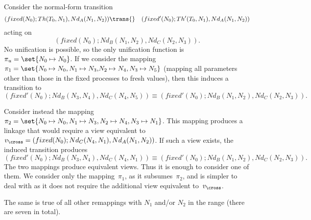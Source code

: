 \begin{example}\label{example:29}
Consider the normal-form transition
\begin{eqnarray*}
(fixed(N_0); Th(T_0,N_1), Nd_A(N_1,N_2)) & \trans{} &
  (fixed'(N_0); Th'(T_0,N_1), Nd_A(N_1,N_2))
\end{eqnarray*}
acting on 
\[
(fixed(N_0); Nd_B(N_1,N_2), Nd_C(N_2,N_3)).
\]
No unification is possible, so the only unification function is $\pi_{u} =
\set{N_0 \mapsto N_0}$.  If we consider the mapping $\pi_1 = \set{N_0 \mapsto
  N_0, \linebreak[1] {N_1 \mapsto N_3,} \linebreak[1] {N_2 \mapsto N_4},
  \linebreak[1] N_3 \mapsto N_5}$ (mapping all parameters other than those in
the fixed processes to fresh values), then this induces a transition to
\[
(fixed'(N_0); Nd_B(N_3,N_4), Nd_C(N_4,N_5)) \equiv 
  (fixed'(N_0); Nd_B(N_1,N_2), Nd_C(N_2,N_3)).
\] 

Consider instead the mapping $\pi_2 = \set{N_0 \mapsto N_0, N_1 \mapsto N_3,
  N_2 \mapsto N_4,\linebreak[1] {N_3 \mapsto N_1}}$.  This mapping produces a
linkage that would require a view equivalent to $v_\cross = (fixed(N_0);
Nd_C(N_4,N_1), Nd_A(N_1,N_2))$.  If such a view exists, the induced transition
produces
\[
(fixed'(N_0); Nd_B(N_3,N_4), Nd_C(N_4,N_1)) \equiv 
  (fixed'(N_0); Nd_B(N_1,N_2), Nd_C(N_2,N_3)).
\]
The two mappings produce equivalent views.  Thus it is enough to consider one
of them.  We consider only the mapping~$\pi_1$, as it subsumes~$\pi_2$, and is
simpler to deal with as it does not require the additional view equivalent
to~$v_\cross$.

The same is true of all other remappings with $N_1$ and/or $N_2$ in the range
(there are seven in total).
\end{example}



